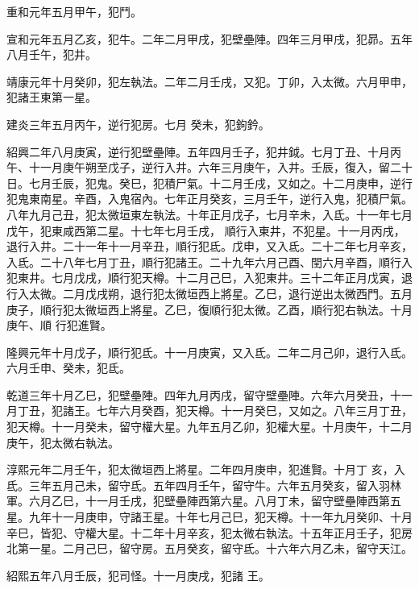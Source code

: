 \begin{pinyinscope}
 重和元年五月甲午，犯鬥。



 宣和元年五月乙亥，犯牛。二年二月甲戌，犯壁壘陣。四年三月甲戌，犯昴。五年八月壬午，犯井。



 靖康元年十月癸卯，犯左執法。二年二月壬戌，又犯。丁卯，入太微。六月甲申，犯諸王東第一星。



 建炎三年五月丙午，逆行犯房。七月
 癸未，犯鉤鈐。



 紹興二年八月庚寅，逆行犯壁壘陣。五年四月壬子，犯井鉞。七月丁丑、十月丙午、十一月庚午朔至戊子，逆行入井。六年三月庚午，入井。壬辰，復入，留二十日。七月壬辰，犯鬼。癸巳，犯積尸氣。十二月壬戌，又如之。十二月庚申，逆行犯鬼東南星。辛酉，入鬼宿內。七年正月癸亥，三月壬午，逆行入鬼，犯積尸氣。八年九月己丑，犯太微垣東左執法。十年正月戊子，七月辛未，入氐。十一年七月戊午，犯東咸西第二星。十七年七月壬戌，
 順行入東井，不犯星。十一月丙戌，退行入井。二十一年十一月辛丑，順行犯氐。戊申，又入氐。二十二年七月辛亥，入氐。二十八年七月丁丑，順行犯諸王。二十九年六月己酉、閏六月辛酉，順行入犯東井。七月戊戌，順行犯天樽。十二月己巳，入犯東井。三十二年正月戊寅，退行入太微。二月戊戌朔，退行犯太微垣西上將星。乙巳，退行逆出太微西門。五月庚子，順行犯太微垣西上將星。乙巳，復順行犯太微。乙酉，順行犯右執法。十月庚午、順
 行犯進賢。



 隆興元年十月戊子，順行犯氐。十一月庚寅，又入氐。二年二月己卯，退行入氐。六月壬申、癸未，犯氐。



 乾道三年十月乙巳，犯壁壘陣。四年九月丙戌，留守壁壘陣。六年六月癸丑，十一月丁丑，犯諸王。七年六月癸酉，犯天樽。十一月癸巳，又如之。八年三月丁丑，犯天樽。十一月癸未，留守權大星。九年五月乙卯，犯權大星。十月庚午，十二月庚午，犯太微右執法。



 淳熙元年二月壬午，犯太微垣西上將星。二年四月庚申，犯進賢。十月丁
 亥，入氐。三年五月己未，留守氐。五年四月壬午，留守牛。六年五月癸亥，留入羽林軍。六月乙巳，十一月壬戌，犯壁壘陣西第六星。八月丁未，留守壁壘陣西第五星。九年十一月庚申，守諸王星。十年七月己巳，犯天樽。十一年九月癸卯、十月辛巳，皆犯、守權大星。十二年十月辛亥，犯太微右執法。十五年正月壬子，犯房北第一星。二月己巳，留守房。五月癸亥，留守氐。十六年六月乙未，留守天江。



 紹熙五年八月壬辰，犯司怪。十一月庚戌，犯諸
 王。




\end{pinyinscope}
